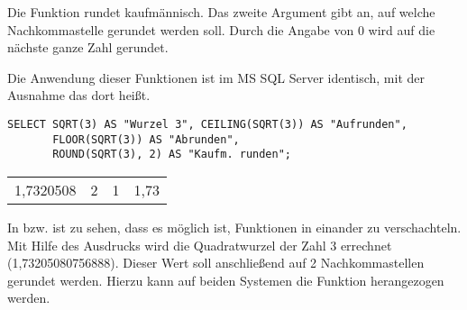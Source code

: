         \begin{merke}
          Die Funktion  rundet kaufmännisch. Das zweite
          Argument gibt an, auf welche Nachkommastelle gerundet werden soll.
          Durch die Angabe von 0 wird auf die nächste ganze Zahl gerundet.
        \end{merke}
        Die Anwendung dieser Funktionen ist im MS SQL Server identisch, mit der
        Ausnahme das  dort 
        heißt.
\clearpage
        \begin{lstlisting}[language=ms_sql,caption={Rundungsfunktionen in MS SQL},label=sql03_16]
SELECT SQRT(3) AS "Wurzel 3", CEILING(SQRT(3)) AS "Aufrunden",
       FLOOR(SQRT(3)) AS "Abrunden",
       ROUND(SQRT(3), 2) AS "Kaufm. runden";
        \end{lstlisting}
        \begin{center}
          \begin{small}
            \tablehead{}

            \begin{mssql}
              \begin{supertabular}{llll}
                1,7320508 & 2 & 1 & 1,73 \\
              \end{supertabular}
            \end{mssql}
          \end{small}
        \end{center}
        In  bzw.  ist zu sehen, dass es
        möglich ist, Funktionen in einander zu verschachteln. Mit Hilfe des
        Ausdrucks  wird die Quadratwurzel der Zahl 3
        errechnet (1,73205080756888). Dieser Wert soll anschließend auf 2
        Nachkommastellen gerundet werden. Hierzu kann auf beiden Systemen die
        Funktion  herangezogen werden. 
        
